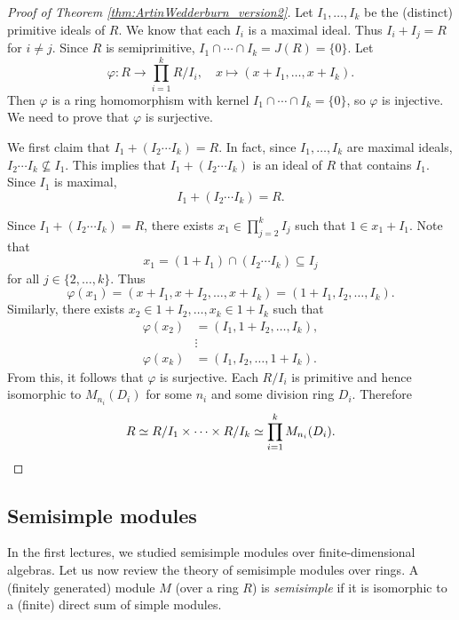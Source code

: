 \begin{proof}[Proof of Theorem \ref{thm:ArtinWedderburn_version2}]
    Let $I_1,\dots,I_k$ be the (distinct) primitive ideals of $R$. 
    We know that each $I_i$ is a maximal ideal. Thus $I_i+I_j=R$ for
    $i\ne j$. Since $R$ is semiprimitive, 
    $I_1\cap\cdots\cap I_k=J(R)=\{0\}$. Let 
    \[
    \varphi\colon R\to \prod_{i=1}^k R/I_i,\quad
    x\mapsto (x+I_1,\dots,x+I_k).
    \]
    Then $\varphi$ is a ring homomorphism with kernel $I_1\cap\cdots\cap I_k=\{0\}$, so
    $\varphi$ is injective. We need to prove that $\varphi$ is surjective. 
    
    We first claim that 
    $I_1+( I_2\cdots I_k) = R$. In fact, 
    since $I_1,\dots,I_k$ are maximal ideals, $I_2\cdots I_k\not\subseteq I_1$. This implies
    that $I_1+(I_2\cdots I_k)$ is an ideal of $R$ that contains $I_1$. Since $I_1$ is maximal, 
    \[
    I_1+(I_2\cdots I_k)=R.
    \]
    
    Since $I_1+( I_2\cdots I_k) = R$, 
    there exists $x_1\in \prod_{j=2}^kI_j$ such that $1\in x_1+I_1$. Note that
    \[
    x_1=(1+I_1)\cap (I_2\cdots I_k)\subseteq I_j
    \]
    for all $j\in\{2,\dots,k\}$. 
    Thus 
    \[
    \varphi(x_1)=(x+I_1,x+I_2,\dots,x+I_k)=(1+I_1,I_2,\dots, I_k).
    \]
    Similarly,
    there exists $x_2\in 1+I_2,\dots, x_k\in 1+I_k$ such that 
    \begin{align*}
    \varphi(x_2)&=(I_1,1+I_2,\dots,I_k),\\
    &\vdots\\
    \varphi(x_k)&=(I_1,I_2,\dots,1+I_k).
    \end{align*}
    From this, it follows that $\varphi$ is surjective. Each $R/I_i$ 
    is primitive and hence isomorphic to $M_{n_i}(D_i)$ for some 
    $n_i$ and some division ring $D_i$. Therefore
    \[
    R\simeq R/I_1\times\cdots\times R/I_k\simeq \prod_{i=1}^kM_{n_i}(D_i).\qedhere 
    \]
\end{proof}



\subsection{Semisimple modules}


In the first lectures, we studied semisimple modules over finite-dimensional 
algebras. Let us now review the theory of semisimple modules over rings. 
A (finitely generated) module $M$ (over a ring $R$) is \emph{semisimple} 
if it is isomorphic to a (finite) direct sum of simple modules. 

